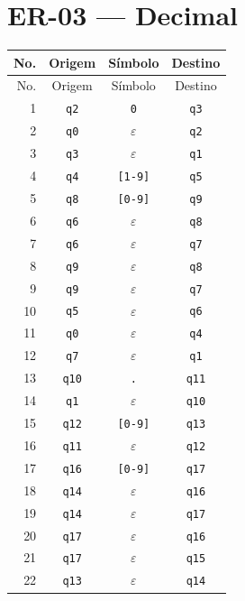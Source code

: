 \section{ER-03 --- Decimal}
\small
\begin{longtable}{|r|c|c|c|}
\toprule
No. & Origem & Símbolo & Destino \\
\midrule
\endfirsthead
\toprule
No. & Origem & Símbolo & Destino \\
\midrule
\endhead
1 & \texttt{q2} & \texttt{0} & \texttt{q3} \\
2 & \texttt{q0} & $\varepsilon$ & \texttt{q2} \\
3 & \texttt{q3} & $\varepsilon$ & \texttt{q1} \\
4 & \texttt{q4} & \texttt{[1-9]} & \texttt{q5} \\
5 & \texttt{q8} & \texttt{[0-9]} & \texttt{q9} \\
6 & \texttt{q6} & $\varepsilon$ & \texttt{q8} \\
7 & \texttt{q6} & $\varepsilon$ & \texttt{q7} \\
8 & \texttt{q9} & $\varepsilon$ & \texttt{q8} \\
9 & \texttt{q9} & $\varepsilon$ & \texttt{q7} \\
10 & \texttt{q5} & $\varepsilon$ & \texttt{q6} \\
11 & \texttt{q0} & $\varepsilon$ & \texttt{q4} \\
12 & \texttt{q7} & $\varepsilon$ & \texttt{q1} \\
13 & \texttt{q10} & \texttt{.} & \texttt{q11} \\
14 & \texttt{q1} & $\varepsilon$ & \texttt{q10} \\
15 & \texttt{q12} & \texttt{[0-9]} & \texttt{q13} \\
16 & \texttt{q11} & $\varepsilon$ & \texttt{q12} \\
17 & \texttt{q16} & \texttt{[0-9]} & \texttt{q17} \\
18 & \texttt{q14} & $\varepsilon$ & \texttt{q16} \\
19 & \texttt{q14} & $\varepsilon$ & \texttt{q17} \\
20 & \texttt{q17} & $\varepsilon$ & \texttt{q16} \\
21 & \texttt{q17} & $\varepsilon$ & \texttt{q15} \\
22 & \texttt{q13} & $\varepsilon$ & \texttt{q14} \\
\bottomrule
\end{longtable}
